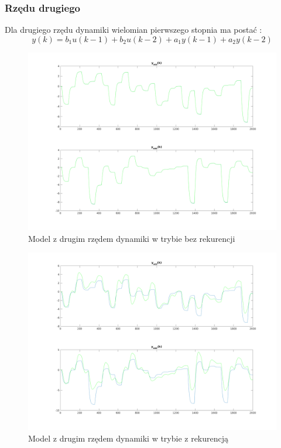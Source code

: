 \documentclass[a4paper, 11pt]{article}
\begin{document}
\subsubsection{Rzędu drugiego}
Dla drugiego rzędu dynamiki wielomian pierwszego stopnia ma postać : 
$$y(k) = b_1u(k-1)+b_2u(k-2) + a_1y(k-1)+a_2y(k-2)$$
\begin{figure}[H]
\centering
\includegraphics[scale=0.50]{dane_dyn_mod_brek_D_2.png}
\caption{Model z drugim rzędem dynamiki w trybie bez rekurencji }
\label{}
\end{figure}
\begin{figure}[H]
\centering
\includegraphics[scale=0.50]{dane_dyn_mod_rek_D_2.png}
\caption{Model z drugim rzędem dynamiki w trybie z rekurencją }
\label{}
\end{figure}
\end{document}
